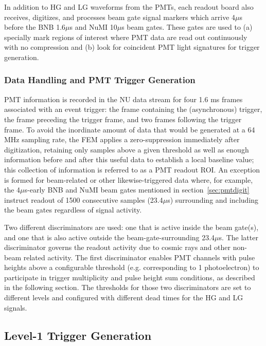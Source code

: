 In addition to HG and LG waveforms from the PMTs, each readout board also receives, digitizes, and processes beam gate signal markers which arrive 4$\mu$s before the BNB 1.6$\mu$s and NuMI 10$\mu$s beam gates. These gates are used to (a) specially mark regions of interest where PMT data are read out continuously with no compression and (b) look for coincident PMT light signatures for trigger generation. 

\subsubsection{Data Handling and PMT Trigger Generation}
\label{tpcfem}

PMT information is recorded in the NU data stream for four 1.6 ms frames associated with an event trigger: the frame containing the (asynchronous) trigger, the frame preceding the trigger frame, and two frames following the trigger frame. To avoid the inordinate amount of data that would be generated at a 64 MHz sampling rate, the FEM applies a zero-suppression immediately after digitization, retaining only samples above a given threshold as well as enough information before and after this useful data to establish a local baseline value; this collection of information is referred to as a PMT readout ROI. An exception is formed for beam-related or other likewise-triggered data where, for example,  the 4$\mu$s-early BNB and NuMI beam gates mentioned in section~\ref{sec:pmtdigit} instruct readout of 1500 consecutive samples (23.4$\mu$s) surrounding and including the beam gates regardless of signal activity.

Two different discriminators are used: one that is active inside the beam gate(s), and one that is also active outside the beam-gate-surrounding 23.4$\mu$s. The latter discriminator governs the readout activity due to cosmic rays and other non-beam related activity. The first discriminator enables PMT channels with pulse heights above a configurable threshold (e.g. corresponding to 1 photoelectron)  to participate in trigger multiplicity and pulse height sum conditions, as described in the following section. The thresholds for those two discriminators are set to different levels and configured with different dead times for the HG and LG signals.

\subsection{Level-1 Trigger Generation}
\label{sec:trigger}

